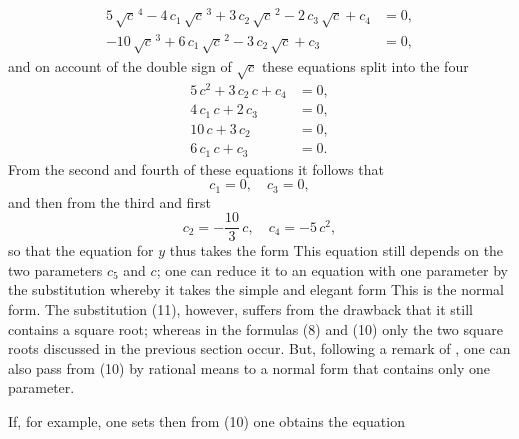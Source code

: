 \[
\begin{aligned}
5\,\sqrt{c}^{\,4} - 4\,c_1\,\sqrt{c}^{\,3} + 3\,c_2\,\sqrt{c}^{\,2} - 2\,c_3\,\sqrt{c} + c_4 &= 0,\\
-10\,\sqrt{c}^{\,3} + 6\,c_1\,\sqrt{c}^{\,2} - 3\,c_2\,\sqrt{c} + c_3 &= 0,
\end{aligned}
\]
and on account of the double sign of $\sqrt{c}$ these equations split into the four
\[
\begin{aligned}
5\,c^2 + 3\,c_2\,c + c_4 &= 0,\\
4\,c_1\,c + 2\,c_3 &= 0,\\
10\,c + 3\,c_2 &= 0,\\
6\,c_1\,c + c_3 &= 0.
\end{aligned}
\]
From the second and fourth of these equations it follows that
\[
c_1 = 0, \quad c_3 = 0,
\]
and then from the third and first
\[
c_2 = -\frac{10}{3}\,c, \quad c_4 = -5\,c^2,
\]
so that the equation for $y$ thus takes the form
This equation still depends on the two parameters $c_5$ and $c$; one can reduce it to an equation with one parameter by the substitution
whereby it takes the simple and elegant form
This is the  normal form. The substitution (11), however, suffers from the drawback that it still contains a square root; whereas in the formulas (8) and (10) only the two square roots discussed in the previous section occur. But, following a remark of , one can also pass from (10) by rational means to a normal form that contains only one parameter.

If, for example, one sets
then from (10) one obtains the equation
